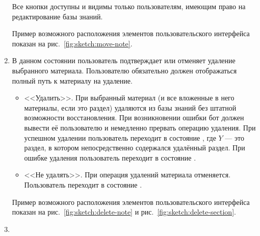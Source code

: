 \begin{enumerate}
            Все кнопки доступны и видимы только пользователям, имеющим право на редактирование базы
            знаний.

            Пример возможного расположения элементов пользовательского интерфейса показан на
            рис.~\ref{fig:sketch:move-note}.


        \item \label{itm:req:ui:states:delete-kbo}

            В данном состоянии пользователь подтверждает или отменяет удаление выбранного
            материала. Пользователю обязательно должен отображаться полный путь к материалу
            на удаление.
            \begin{itemize}
                \item
                    <<Удалить>>.
                    При  выбранный материал (и все вложенные в него материалы,
                    если это раздел) удаляются из базы знаний без штатной возможности восстановления.
                    При возникновении ошибки бот должен вывести её пользователю и немедленно прервать
                    операцию удаления.
                    При успешном удалении пользователь переходит в состояние
                    \hyperref[itm:req:ui:states:navx]
                    {},
                    где \(Y\) --- это раздел, в котором непосредственно содержался удалённый раздел.
                    При ошибке удаления пользователь переходит в состояние
                    \hyperref[itm:req:ui:states:navx]
                    {}.
                \item
                    <<Не удалять>>.
                    При  операция удалений материала отменяется.
                    Пользователь переходит в состояние
                    \hyperref[itm:req:ui:states:navx]
                    {}.
            \end{itemize}

            Пример возможного расположения элементов пользовательского интерфейса показан на
            рис.~\ref{fig:sketch:delete-note} и рис.~\ref{fig:sketch:delete-section}.

        \item \label{itm:req:ui:states:create-note}


\end{enumerate}
